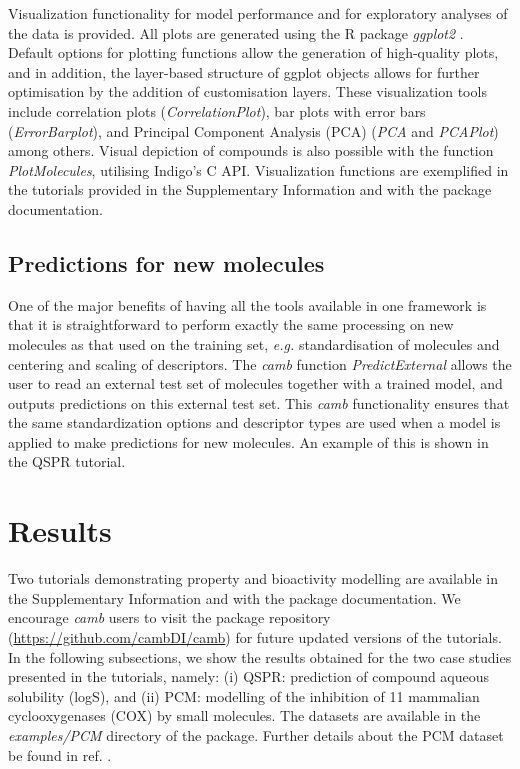 \documentclass[twoside,a4wide,10pt]{article}
\begin{document}
Visualization functionality for model performance and for exploratory analyses of the data is provided. 
All plots are generated using the R package {\it ggplot2} \citep{ggplot2}.
Default options for plotting functions allow the generation of high-quality plots,
and in addition, the layer-based structure of ggplot objects allows for further optimisation
by the addition of customisation layers.  
These visualization tools include correlation plots ({\it CorrelationPlot}),
bar plots with error bars ({\it ErrorBarplot}), and
Principal Component Analysis (PCA) ({\it PCA} and {\it PCAPlot}) among others.
Visual depiction of compounds is also possible with the function {\it PlotMolecules},
utilising Indigo's C API. 
Visualization functions are exemplified in the tutorials provided in the Supplementary Information
and with the package documentation.

\subsection{Predictions for new molecules}
One of the major benefits of having all the tools available in one framework is that 
it is straightforward to perform exactly the same processing on new molecules as that used on the training set,
{\it e.g.} standardisation of molecules and centering and scaling of descriptors.
The {\it camb} function {\it PredictExternal} allows the user to read an external test set of molecules together with a trained model, 
and outputs predictions on this external test set. 
This {\it camb} functionality 
ensures that the same standardization options and descriptor types are used when a model is applied to make predictions for new molecules.
An example of this is shown in the QSPR tutorial.


\section*{Results}
Two tutorials demonstrating property and bioactivity modelling are available in the Supplementary Information
and with the package documentation.
We encourage {\it camb} users to visit the package repository (\url{https://github.com/cambDI/camb})
for future updated versions of the tutorials.
In the following subsections, we show the results obtained for the two case studies 
presented in the tutorials, namely:
(i) QSPR: prediction of compound aqueous solubility (logS),
and (ii) PCM:
modelling of the inhibition of 11 mammalian cyclooxygenases (COX) by small molecules.
The datasets are available in the {\it examples/PCM} directory of the package.
Further details about the PCM dataset be found in ref. \citep{cortesCOX}.
\end{document}
